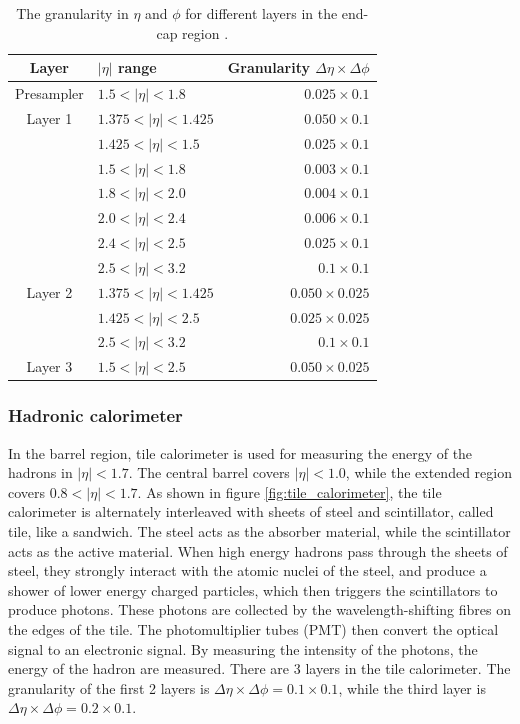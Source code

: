 \begin{table}[htpb]
\centering
\begin{tabular}{|c|l|r|}
\hline
Layer & $|\eta|$ range & Granularity $\Delta \eta \times \Delta \phi$ \\
\hline
\hline
Presampler & $1.5   < |\eta| < 1.8$   & $0.025 \times 0.1$ \\
\hline
Layer 1    & $1.375 < |\eta| < 1.425$ & $0.050 \times 0.1$ \\
           & $1.425 < |\eta| < 1.5$   & $0.025 \times 0.1$ \\
           & $1.5   < |\eta| < 1.8$   & $0.003 \times 0.1$ \\
           & $1.8   < |\eta| < 2.0$   & $0.004 \times 0.1$ \\
           & $2.0   < |\eta| < 2.4$   & $0.006 \times 0.1$ \\
           & $2.4   < |\eta| < 2.5$   & $0.025 \times 0.1$ \\
           & $2.5   < |\eta| < 3.2$   & $0.1   \times 0.1$ \\
\hline
Layer 2    & $1.375 < |\eta| < 1.425$ & $0.050 \times 0.025$ \\
           & $1.425 < |\eta| < 2.5$   & $0.025 \times 0.025$ \\
           & $2.5   < |\eta| < 3.2$   & $0.1   \times 0.1$ \\
\hline
Layer 3    & $1.5   < |\eta| < 2.5$   & $0.050 \times 0.025$ \\
\hline
\end{tabular}
\caption{The granularity in $\eta$ and $\phi$ for different layers in the end-cap region \cite{ATLAS_doc}.}
\label{tab:granularity_EM_endcap}
\end{table}

\subsubsection{Hadronic calorimeter}
In the barrel region, tile calorimeter is used for measuring the energy of the hadrons in $|\eta| < 1.7$.
The central barrel covers $|\eta| < 1.0$, while the extended region covers $0.8 < |\eta| < 1.7$.
As shown in figure \ref{fig:tile_calorimeter}, the tile calorimeter is alternately interleaved with sheets of steel and scintillator, called tile, like a sandwich.
The steel acts as the absorber material, while the scintillator acts as the active material.
When high energy hadrons pass through the sheets of steel, they strongly interact with the atomic nuclei of the steel, and produce a shower of lower energy charged particles, which then triggers the scintillators to produce photons.
These photons are collected by the wavelength-shifting fibres on the edges of the tile.
The photomultiplier tubes (PMT) then convert the optical signal to an electronic signal.
By measuring the intensity of the photons, the energy of the hadron are measured.
There are 3 layers in the tile calorimeter.
The granularity of the first 2 layers is $\Delta \eta \times \Delta \phi = 0.1 \times 0.1$, while the third layer is $\Delta \eta \times \Delta \phi = 0.2 \times 0.1$.

